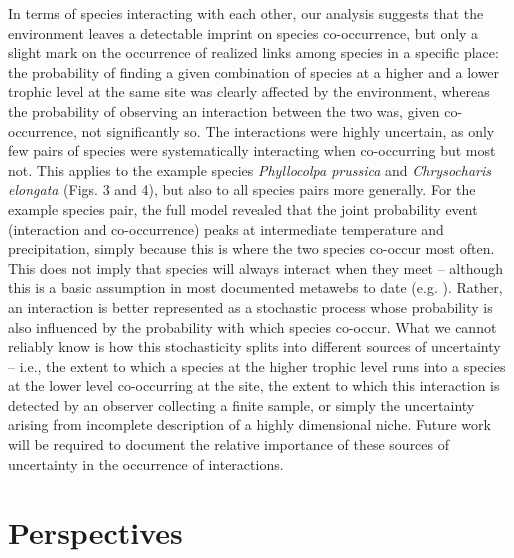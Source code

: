\documentclass[12pt]{article}
\begin{document}
In terms of species interacting with each other, our analysis suggests that
the environment leaves a detectable imprint on species co-occurrence, but only
a slight mark on the occurrence of realized links among species in a specific
place: the probability of finding a given combination of species at a higher
and a lower trophic level at the same site was clearly affected by the
environment, whereas the probability of observing an interaction between the
two was, given co-occurrence, not significantly so. The interactions were  highly
uncertain, as only few pairs of species were systematically interacting when
co-occurring but most not. This applies to the example species
\textit{Phyllocolpa prussica} and \textit{Chrysocharis elongata} (Figs. 3 and
4), but also to all species pairs more generally. For the example species
pair, the full model revealed that the joint probability event (interaction
and co-occurrence) peaks at intermediate temperature and precipitation, simply
because this is where the two species co-occur most often. This does not imply
that species will always interact when they meet – although this is a basic
assumption in most documented metawebs to date (e.g. \citealt{Havens1992,
Wood2015}). Rather, an interaction is better represented as a stochastic
process whose probability is also influenced by the probability with which
species co-occur. What we cannot reliably know is how this stochasticity
splits into different sources of uncertainty – i.e., the extent to which a
species at the higher trophic level runs into a species at the lower level co-occurring at the site, the extent to which this interaction is detected by an
observer collecting a finite sample, or simply the uncertainty arising from
incomplete description of a highly dimensional niche. Future work will be
required to document the relative importance of these sources of uncertainty
in the occurrence of interactions.

\section*{Perspectives}
\end{document}
